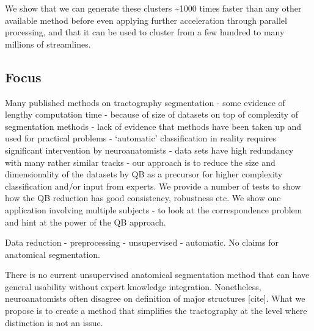 \documentclass{bioinfo}
\begin{document}
We show that we can generate these clusters \textasciitilde1000 times
faster than any other available method before even applying further
acceleration through parallel processing, and that it can be used to
cluster from a few hundred to many millions of streamlines.


\subsection{Focus}

Many published methods on tractography segmentation - some evidence of
lengthy computation time - because of size of datasets on top of
complexity of segmentation methods - lack of evidence that methods have
been taken up and used for practical problems - ‘automatic’
classification in reality requires significant intervention by
neuroanatomists - data sets have high redundancy with many rather
similar tracks - our approach is to reduce the size and dimensionality
of the datasets by QB as a precursor for higher complexity
classification and/or input from experts. We provide a number of tests
to show how the QB reduction has good consistency, robustness etc. We
show one application involving multiple subjects - to look at the
correspondence problem and hint at the power of the QB approach.

Data reduction - preprocessing - unsupervised - automatic. No claims for
anatomical segmentation.

There is no current unsupervised anatomical segmentation method that can
have general usability without expert knowledge
integration. Nonetheless, neuroanatomists often disagree on definition
of major structures [cite]. What we propose is to create a method that
simplifies the tractography at the level where distinction is not an
issue.
\end{document}
